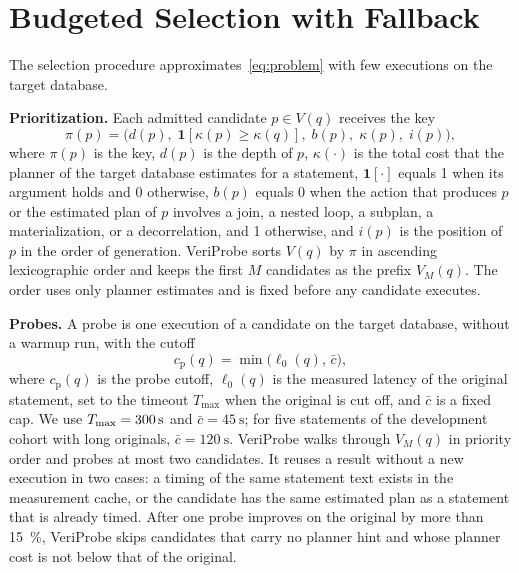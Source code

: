 \documentclass[conference]{IEEEtran}
\newcommand{\sys}{VeriProbe}
\begin{document}
\section{Budgeted Selection with Fallback}
\label{sec:selection}

The selection procedure approximates~\eqref{eq:problem} with few executions on the target database.

\textbf{Prioritization.}
Each admitted candidate $p \in V(q)$ receives the key
\begin{equation}
\pi(p) = \bigl(d(p),\; \mathbf{1}[\kappa(p) \ge \kappa(q)],\; b(p),\; \kappa(p),\; i(p)\bigr),
\label{eq:priority}
\end{equation}
where $\pi(p)$ is the key, $d(p)$ is the depth of $p$, $\kappa(\cdot)$ is the total cost that the planner of the target database estimates for a statement, $\mathbf{1}[\cdot]$ equals 1 when its argument holds and 0 otherwise, $b(p)$ equals 0 when the action that produces $p$ or the estimated plan of $p$ involves a join, a nested loop, a subplan, a materialization, or a decorrelation, and 1 otherwise, and $i(p)$ is the position of $p$ in the order of generation.
\sys{} sorts $V(q)$ by $\pi$ in ascending lexicographic order and keeps the first $M$ candidates as the prefix $V_{M}(q)$.
The order uses only planner estimates and is fixed before any candidate executes.

\textbf{Probes.}
A probe is one execution of a candidate on the target database, without a warmup run, with the cutoff
\begin{equation}
c_{\mathrm{p}}(q) = \min\bigl(\ell_{0}(q),\, \bar{c}\bigr),
\label{eq:probe}
\end{equation}
where $c_{\mathrm{p}}(q)$ is the probe cutoff, $\ell_{0}(q)$ is the measured latency of the original statement, set to the timeout $T_{\max}$ when the original is cut off, and $\bar{c}$ is a fixed cap.
We use $T_{\max} = \SI{300}{\second}$ and $\bar{c} = \SI{45}{\second}$; for five statements of the development cohort with long originals, $\bar{c} = \SI{120}{\second}$.
\sys{} walks through $V_{M}(q)$ in priority order and probes at most two candidates.
It reuses a result without a new execution in two cases: a timing of the same statement text exists in the measurement cache, or the candidate has the same estimated plan as a statement that is already timed.
After one probe improves on the original by more than \SI{15}{\percent}, \sys{} skips candidates that carry no planner hint and whose planner cost is not below that of the original.
\end{document}
